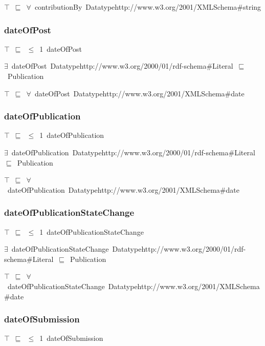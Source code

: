 \documentclass{article}
\begin{document}
\ensuremath{\top}~\ensuremath{\sqsubseteq}~\ensuremath{\forall}~contributionBy~Datatypehttp://www.w3.org/2001/XMLSchema#string

\subsubsection*{dateOfPost}

\ensuremath{\top}~\ensuremath{\sqsubseteq}~\ensuremath{\leq}~1~dateOfPost

\ensuremath{\exists}~dateOfPost~Datatypehttp://www.w3.org/2000/01/rdf-schema#Literal~\ensuremath{\sqsubseteq}~Publication

\ensuremath{\top}~\ensuremath{\sqsubseteq}~\ensuremath{\forall}~dateOfPost~Datatypehttp://www.w3.org/2001/XMLSchema#date

\subsubsection*{dateOfPublication}

\ensuremath{\top}~\ensuremath{\sqsubseteq}~\ensuremath{\leq}~1~dateOfPublication

\ensuremath{\exists}~dateOfPublication~Datatypehttp://www.w3.org/2000/01/rdf-schema#Literal~\ensuremath{\sqsubseteq}~Publication

\ensuremath{\top}~\ensuremath{\sqsubseteq}~\ensuremath{\forall}~dateOfPublication~Datatypehttp://www.w3.org/2001/XMLSchema#date

\subsubsection*{dateOfPublicationStateChange}

\ensuremath{\top}~\ensuremath{\sqsubseteq}~\ensuremath{\leq}~1~dateOfPublicationStateChange

\ensuremath{\exists}~dateOfPublicationStateChange~Datatypehttp://www.w3.org/2000/01/rdf-schema#Literal~\ensuremath{\sqsubseteq}~Publication

\ensuremath{\top}~\ensuremath{\sqsubseteq}~\ensuremath{\forall}~dateOfPublicationStateChange~Datatypehttp://www.w3.org/2001/XMLSchema#date

\subsubsection*{dateOfSubmission}

\ensuremath{\top}~\ensuremath{\sqsubseteq}~\ensuremath{\leq}~1~dateOfSubmission
\end{document}
